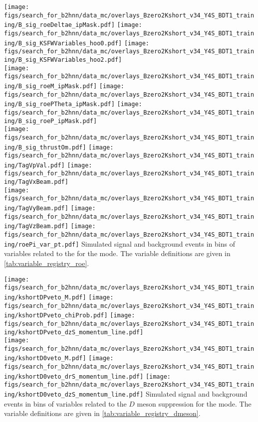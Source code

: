 {
\texttt{[image: figs/search\_for\_b2hnn/data\_mc/overlays\_Bzero2Kshort\_v34\_Y4S\_BDT1\_training/B\_sig\_roeDeltae\_ipMask.pdf]}
\texttt{[image: figs/search\_for\_b2hnn/data\_mc/overlays\_Bzero2Kshort\_v34\_Y4S\_BDT1\_training/B\_sig\_KSFWVariables\_hoo0.pdf]}
\texttt{[image: figs/search\_for\_b2hnn/data\_mc/overlays\_Bzero2Kshort\_v34\_Y4S\_BDT1\_training/B\_sig\_KSFWVariables\_hoo2.pdf]}\\
\texttt{[image: figs/search\_for\_b2hnn/data\_mc/overlays\_Bzero2Kshort\_v34\_Y4S\_BDT1\_training/B\_sig\_roeM\_ipMask.pdf]}
\texttt{[image: figs/search\_for\_b2hnn/data\_mc/overlays\_Bzero2Kshort\_v34\_Y4S\_BDT1\_training/B\_sig\_roePTheta\_ipMask.pdf]}
\texttt{[image: figs/search\_for\_b2hnn/data\_mc/overlays\_Bzero2Kshort\_v34\_Y4S\_BDT1\_training/B\_sig\_roeP\_ipMask.pdf]}\\
\texttt{[image: figs/search\_for\_b2hnn/data\_mc/overlays\_Bzero2Kshort\_v34\_Y4S\_BDT1\_training/B\_sig\_thrustOm.pdf]}
\texttt{[image: figs/search\_for\_b2hnn/data\_mc/overlays\_Bzero2Kshort\_v34\_Y4S\_BDT1\_training/TagVpVal.pdf]}
\texttt{[image: figs/search\_for\_b2hnn/data\_mc/overlays\_Bzero2Kshort\_v34\_Y4S\_BDT1\_training/TagVxBeam.pdf]}\\
\texttt{[image: figs/search\_for\_b2hnn/data\_mc/overlays\_Bzero2Kshort\_v34\_Y4S\_BDT1\_training/TagVyBeam.pdf]}
\texttt{[image: figs/search\_for\_b2hnn/data\_mc/overlays\_Bzero2Kshort\_v34\_Y4S\_BDT1\_training/TagVzBeam.pdf]}
\texttt{[image: figs/search\_for\_b2hnn/data\_mc/overlays\_Bzero2Kshort\_v34\_Y4S\_BDT1\_training/roePi\_var\_pt.pdf]}
}
{
Simulated signal and background events in bins of variables related to the \ROE for the \BKznn mode.
\overlaytext
The variable definitions are given in \cref{tab:variable_registry_roe}.
}

{
\texttt{[image: figs/search\_for\_b2hnn/data\_mc/overlays\_Bzero2Kshort\_v34\_Y4S\_BDT1\_training/kshortDPveto\_M.pdf]}
\texttt{[image: figs/search\_for\_b2hnn/data\_mc/overlays\_Bzero2Kshort\_v34\_Y4S\_BDT1\_training/kshortDPveto\_chiProb.pdf]}
\texttt{[image: figs/search\_for\_b2hnn/data\_mc/overlays\_Bzero2Kshort\_v34\_Y4S\_BDT1\_training/kshortDPveto\_dzS\_momentum\_line.pdf]}\\
\texttt{[image: figs/search\_for\_b2hnn/data\_mc/overlays\_Bzero2Kshort\_v34\_Y4S\_BDT1\_training/kshortD0veto\_M.pdf]}
\texttt{[image: figs/search\_for\_b2hnn/data\_mc/overlays\_Bzero2Kshort\_v34\_Y4S\_BDT1\_training/kshortD0veto\_drS\_momentum\_line.pdf]}
\texttt{[image: figs/search\_for\_b2hnn/data\_mc/overlays\_Bzero2Kshort\_v34\_Y4S\_BDT1\_training/kshortD0veto\_dzS\_momentum\_line.pdf]}
}
{
Simulated signal and background events in bins of variables related to the $D$ meson suppression for the \BKznn mode.
\overlaytext
The variable definitions are given in \cref{tab:variable_registry_dmeson}.
}
